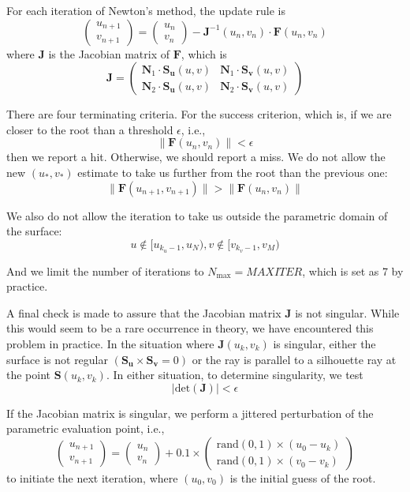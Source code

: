 \documentclass[acmtog]{acmart}
\begin{document}
For each iteration of Newton's method, the update rule is
\[
    \begin{pmatrix}
        u_{n+1}\\
        v_{n+1}
    \end{pmatrix}
    =
    \begin{pmatrix}
        u_{n}\\
        v_{n}
    \end{pmatrix}
    -\mathbf{J}^{-1}(u_n,v_n)\cdot\mathbf{F}(u_n,v_n)
\]
where $\mathbf{J}$ is the Jacobian matrix of $\mathbf{F}$, which is
\[
    \mathbf{J}=\begin{pmatrix}
        \mathbf{N}_1\cdot\mathbf{S}_{\mathbf{u}}(u,v)&\mathbf{N}_1\cdot\mathbf{S}_{\mathbf{v}}(u,v)\\
        \mathbf{N}_2\cdot\mathbf{S}_{\mathbf{u}}(u,v)&\mathbf{N}_2\cdot\mathbf{S}_{\mathbf{v}}(u,v)
    \end{pmatrix}
\]

There are four terminating criteria. For the success criterion, which is, if we are closer to the root than a threshold $\epsilon$, i.e.,
\[
    \lVert\mathbf{F}(u_n,v_n)\rVert<\epsilon
\]
then we report a hit. Otherwise, we should report a miss. We do not allow the new $(u_*,v_*)$ estimate to take us further from the root than the previous one:
\[
    \lVert\mathbf{F}(u_{n+1},v_{n+1})\rVert>\lVert\mathbf{F}(u_n,v_n)\rVert
\]

We also do not allow the iteration to take us outside the parametric domain of the surface:
\[
    u\notin[u_{k_u-1},u_N),v\notin[v_{k_v-1},v_M)
\]

And we limit the number of iterations to $N_{\text{max}}=MAXITER$, which is set as 7 by practice.

A final check is made to assure that the Jacobian matrix $\mathbf{J}$ is not singular. While this would seem to be a rare occurrence in theory, we have encountered this problem in practice. In the situation where $\mathbf{J}(u_k,v_k)$ is singular, either the surface is not regular $(\mathbf{S}_{\mathbf{u}} \times \mathbf{S}_{\mathbf{v}} = 0)$ or the ray is parallel to a silhouette ray at the point $\mathbf{S}(u_k , v_k)$. In either situation, to determine singularity, we test
\[|\mathrm{det}(\mathbf{J})|<\epsilon\]

If the Jacobian matrix is singular, we perform a jittered perturbation of the parametric evaluation point, i.e.,
\[
    \begin{pmatrix}
        u_{n+1}\\
        v_{n+1}
    \end{pmatrix}
    =
    \begin{pmatrix}
        u_{n}\\
        v_{n}
    \end{pmatrix}
    +0.1\times
    \begin{pmatrix}
        \mathrm{rand}(0,1)\times(u_0-u_k)\\
        \mathrm{rand}(0,1)\times(v_0-v_k)
    \end{pmatrix}
\]
to initiate the next iteration, where $(u_0,v_0)$ is the initial guess of the root.
\end{document}
